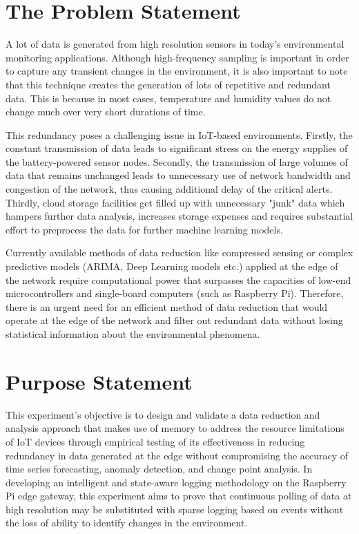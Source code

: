 \section{The Problem Statement}
A lot of data is generated from high resolution sensors in today’s environmental monitoring applications. Although high-frequency sampling is important in order to capture any transient changes in the environment, it is also important to note that this technique creates the generation of lots of repetitive and redundant data. This is because in most cases, temperature and humidity values do not change much over very short durations of time.

This redundancy poses a challenging issue in IoT-based environments. Firstly, the constant transmission of data leads to significant stress on the energy supplies of the battery-powered sensor nodes. Secondly, the transmission of large volumes of data that remains unchanged leads to unnecessary use of network bandwidth and congestion of the network, thus causing additional delay of the critical alerts. Thirdly, cloud storage facilities get filled up with unnecessary "junk" data which hampers further data analysis, increases storage expenses and requires substantial effort to preprocess the data for further machine learning models. 

Currently available methods of data reduction like compressed sensing or complex predictive models (ARIMA, Deep Learning models etc.) applied at the edge of the network require computational power that surpasses the capacities of low-end microcontrollers and single-board computers (such as Raspberry Pi). Therefore, there is an urgent need for an efficient method of data reduction that would operate at the edge of the network and filter out redundant data without losing statistical information about the environmental phenomena.

\section{Purpose Statement}
This experiment's objective is to design and validate a data reduction and analysis approach that makes use of memory to address the resource limitations of IoT devices through empirical testing of its effectiveness in reducing redundancy in data generated at the edge without compromising the accuracy of time series forecasting, anomaly detection, and change point analysis. In developing an intelligent and state-aware logging methodology on the Raspberry Pi edge gateway, this experiment aims to prove that continuous polling of data at high resolution may be substituted with sparse logging based on events without the loss of ability to identify changes in the environment.

